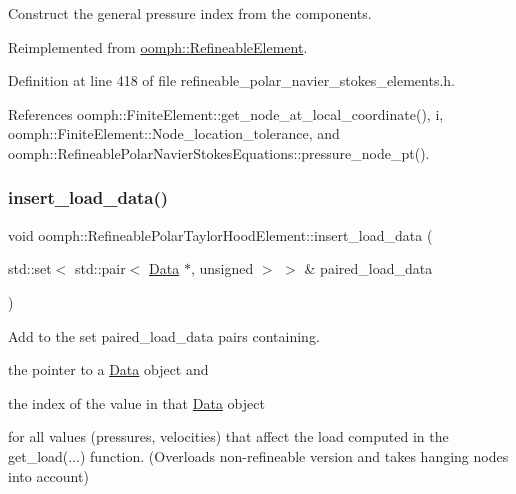Construct the general pressure index from the components. 

Reimplemented from \hyperlink{classoomph_1_1RefineableElement_ad920e66c00888c450f926f08c7793f78}{oomph\+::\+Refineable\+Element}.



Definition at line 418 of file refineable\+\_\+polar\+\_\+navier\+\_\+stokes\+\_\+elements.\+h.



References oomph\+::\+Finite\+Element\+::get\+\_\+node\+\_\+at\+\_\+local\+\_\+coordinate(), i, oomph\+::\+Finite\+Element\+::\+Node\+\_\+location\+\_\+tolerance, and oomph\+::\+Refineable\+Polar\+Navier\+Stokes\+Equations\+::pressure\+\_\+node\+\_\+pt().

\mbox{\label{classoomph_1_1RefineablePolarTaylorHoodElement_a2bff6e8e6d498f62592c3d6775565585}} 
\subsubsection{\texorpdfstring{insert\+\_\+load\+\_\+data()}{insert\_load\_data()}}
{\footnotesize\ttfamily void oomph\+::\+Refineable\+Polar\+Taylor\+Hood\+Element\+::insert\+\_\+load\+\_\+data (\begin{DoxyParamCaption}\item[{std\+::set$<$ std\+::pair$<$ \hyperlink{classoomph_1_1Data}{Data} $\ast$, unsigned $>$ $>$ \&}]{paired\+\_\+load\+\_\+data }\end{DoxyParamCaption})\hspace{0.3cm}{\ttfamily [inline]}}



Add to the set {\ttfamily paired\+\_\+load\+\_\+data} pairs containing. 


\begin{DoxyItemize}
\item the pointer to a \hyperlink{classoomph_1_1Data}{Data} object and
\item the index of the value in that \hyperlink{classoomph_1_1Data}{Data} object
\end{DoxyItemize}for all values (pressures, velocities) that affect the load computed in the {\ttfamily get\+\_\+load}(...) function. (Overloads non-\/refineable version and takes hanging nodes into account) 


